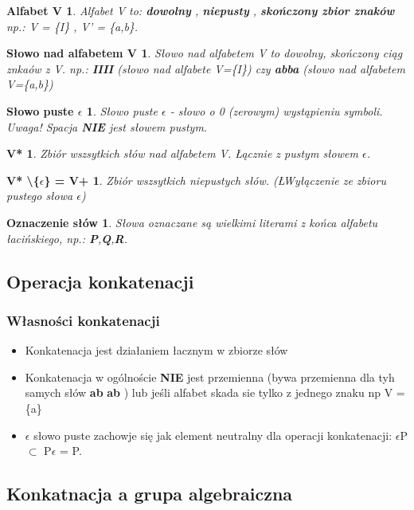 \newtheorem*{theorem3*}{Alfabet V}
\begin{theorem3*} Alfabet V to: { \bf dowolny} , { \bf niepusty} , { \bf skończony zbior znaków}  \newline np.: V = \{I\} , V' = \{a,b\}.
\newline


 \end{theorem3*}


\newtheorem*{theorem4*}{Słowo nad alfabetem V}
\begin{theorem4*} Słowo nad alfabetem V to dowolny, skończony ciąg znkaów z V. np.: {\bf IIII} (słowo nad alfabete V=\{I\}) czy {\bf abba} (słowo nad alfabetem V=\{a,b\}) 
 \end{theorem4*}


\newtheorem*{theorem5*}{Słowo puste $\epsilon$}
\begin{theorem5*}Słowo puste $\epsilon$ - słowo o 0 (zerowym) wystąpieniu symboli. Uwaga! Spacja {\bf NIE} jest słowem pustym.
 \end{theorem5*}
 
 
 \newtheorem*{theorem6*}{V*}
\begin{theorem6*}Zbiór wszsytkich słów nad alfabetem V. Łącznie z pustym słowem $\epsilon$.
 \end{theorem6*}
 
 
\newtheorem*{theorem7*}{V* \textbackslash \{$\epsilon$\} = V+}
\begin{theorem7*}
Zbiór wszsytkich niepustych słów. (ŁWyłączenie ze zbioru pustego słowa $\epsilon$)
 \end{theorem7*}
 
\newtheorem*{theorem8*}{Oznaczenie słów}
\begin{theorem8*}
Słowa oznaczane są wielkimi literami z końca alfabetu łacińskiego, np.: { \bf P},{\bf Q},{\bf R}. 
 \end{theorem8*}
 

\subsection{Operacja konkatenacji}
\subsubsection{Własności konkatenacji}
\begin{itemize}
  \item Konkatenacja jest działaniem łacznym w zbiorze słów
  \item Konkatenacja w ogólnoście {\bf NIE} jest przemienna (bywa przemienna dla tyh samych słów {\bf ab} {\bf ab } ) lub jeśli alfabet skada sie tylko z jednego znaku np V = \{a\}
  \item $\epsilon$ słowo puste zachowje się jak element neutralny dla operacji konkatenacji: \newline $\epsilon$P $\subset$ 
  P$\epsilon$ = P.
\end{itemize}


\subsection{Konkatnacja a grupa algebraiczna}

